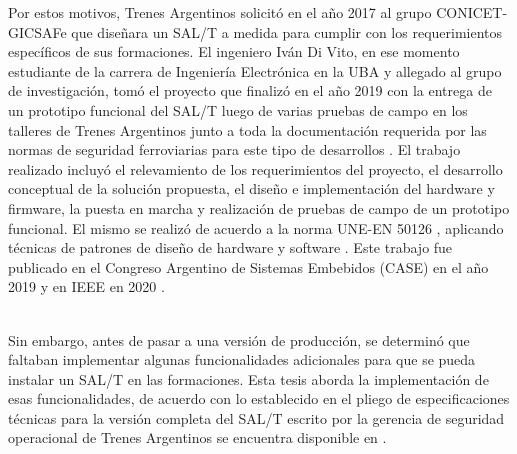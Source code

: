 Por estos motivos, Trenes Argentinos solicitó en el año 2017 al grupo CONICET-GICSAFe que diseñara un SAL/T a medida para cumplir con los requerimientos específicos de sus formaciones. El ingeniero Iván Di Vito, en ese momento estudiante de la carrera de Ingeniería Electrónica en la UBA y allegado al grupo de investigación, tomó el proyecto que finalizó en el año 2019 con la entrega de un prototipo funcional del SAL/T luego de varias pruebas de campo en los talleres de Trenes Argentinos junto a toda la documentación requerida por las normas de seguridad ferroviarias para este tipo de desarrollos \cite{salt_ivan}. El trabajo realizado incluyó el relevamiento de los requerimientos del proyecto, el desarrollo conceptual de la solución propuesta, el diseño e implementación del hardware y firmware, la puesta en marcha y realización de pruebas de campo de un prototipo funcional. El mismo se realizó de acuerdo a la norma UNE-EN 50126 \cite{norma_50126}, aplicando técnicas de patrones de diseño de hardware y software \cite{patrones}. Este trabajo fue publicado en el Congreso Argentino de Sistemas Embebidos (CASE) en el año 2019 \cite{salt_case} y en IEEE en  2020 \cite{salt_paper}. \\\



Sin embargo, antes de pasar a una versión de producción, se determinó que faltaban implementar algunas funcionalidades adicionales para que se pueda instalar un SAL/T en las formaciones. Esta tesis aborda la implementación de esas funcionalidades, de acuerdo con lo establecido en el pliego de especificaciones técnicas para la versión completa del SAL/T escrito por la gerencia de seguridad operacional de Trenes Argentinos se encuentra disponible en \cite{spec}. \\
